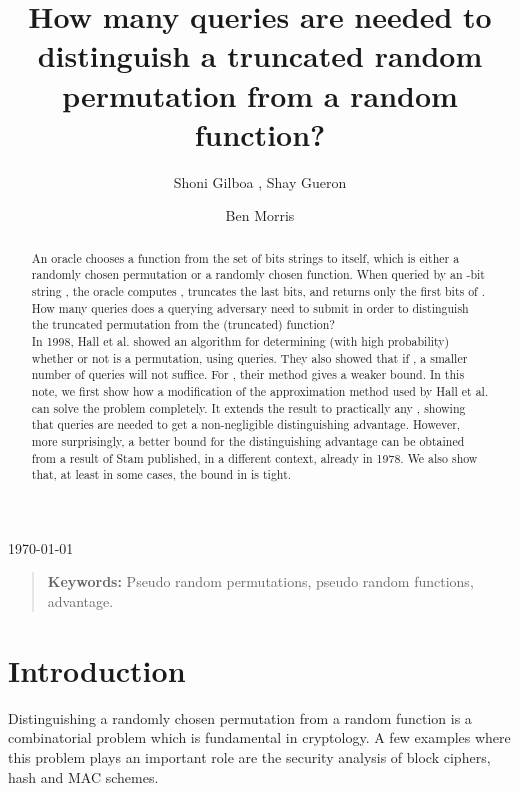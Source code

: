 \documentclass{llncs}
\numberwithin{equation}{section}
\numberwithin{lemma}{section}
\numberwithin{proposition}{section}
\begin{document}
\title{How many queries are needed to distinguish a truncated random permutation from a random function?}

\author{Shoni Gilboa , Shay Gueron  \and Ben Morris }

\maketitle
\centerline{ \today }
 \begin{abstract}

An oracle chooses a function  from the set of  bits strings to itself, which is either a randomly chosen permutation or a randomly chosen function. When queried by an -bit string , the oracle computes , truncates the  last bits, and returns only the first  bits of . How many queries does a querying adversary need to submit in order to distinguish the truncated permutation from the (truncated) function? \\
In 1998, Hall et al. \cite{Hall} showed an algorithm for determining (with high probability) whether or not  is a permutation, using  queries. They also showed that if , a smaller number of queries will not suffice. For , their method gives a weaker bound.
In this note, we first show how a modification of the approximation method used by Hall et al. can solve the problem completely. It extends the result to practically any , showing that  queries are needed to get a non-negligible distinguishing advantage. However, more surprisingly, a better bound for the distinguishing advantage can be obtained from a result of Stam \cite{Stam} published, in a different context, already in 1978. We also show that, at least in some cases, the bound in \cite{Stam} is tight. 
\end{abstract}

{\small
\begin{quote}
\textbf{Keywords:} Pseudo random permutations, pseudo random functions, advantage.
\end{quote}}

\section{Introduction}

Distinguishing a randomly chosen permutation from a random function is a combinatorial problem which is fundamental in cryptology. A few examples where this problem plays an important role are the security analysis of block ciphers, hash and MAC schemes.
 
\end{document}
